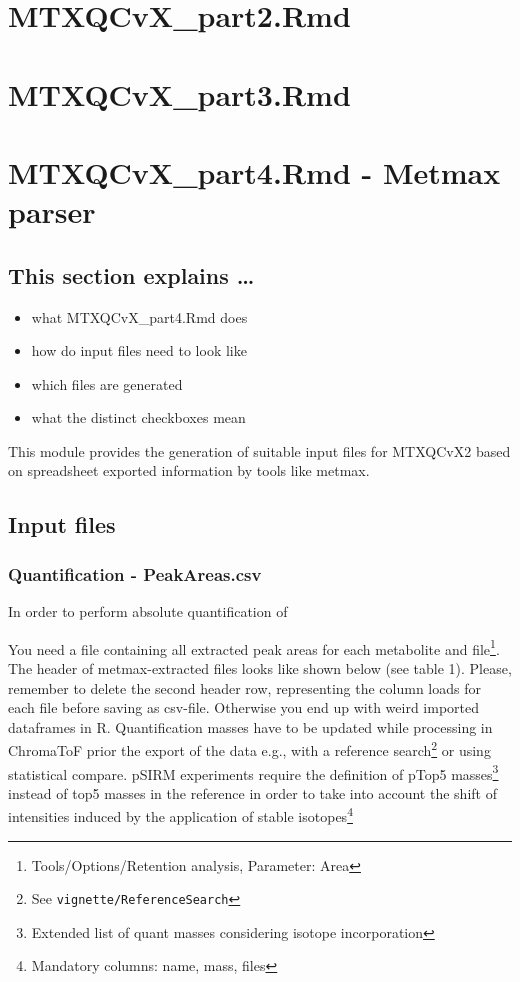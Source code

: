 \documentclass[]{book}
\providecommand{\tightlist}{%
  \setlength{\itemsep}{0pt}\setlength{\parskip}{0pt}}
\let\rmarkdownfootnote\footnote%
\def\footnote{\protect\rmarkdownfootnote}
\theoremstyle{definition}
\theoremstyle{definition}
\theoremstyle{definition}
\theoremstyle{remark}
\begin{document}
\chapter{MTXQCvX\_part2.Rmd}\label{part2}

\chapter{MTXQCvX\_part3.Rmd}\label{part3}

\chapter{MTXQCvX\_part4.Rmd - Metmax parser}\label{Metmax}

\section{This section explains \ldots{}}\label{this-section-explains}

\begin{itemize}
\tightlist
\item
  what MTXQCvX\_part4.Rmd does
\item
  how do input files need to look like
\item
  which files are generated
\item
  what the distinct checkboxes mean
\end{itemize}

This module provides the generation of suitable input files for MTXQCvX2
based on spreadsheet exported information by tools like metmax.

\section{Input files}\label{input-files-1}

\subsection{Quantification -
PeakAreas.csv}\label{quantification---peakareas.csv}

In order to perform absolute quantification of

You need a file containing all extracted peak areas for each metabolite
and file\footnote{Tools/Options/Retention analysis, Parameter: Area}.
The header of metmax-extracted files looks like shown below (see table
1). Please, remember to delete the second header row, representing the
column loads for each file before saving as csv-file. Otherwise you end
up with weird imported dataframes in R. Quantification masses have to be
updated while processing in ChromaToF prior the export of the data e.g.,
with a reference search\footnote{See \texttt{vignette/ReferenceSearch}}
or using statistical compare. pSIRM experiments require the definition
of pTop5 masses\footnote{Extended list of quant masses considering
  isotope incorporation} instead of top5 masses in the reference in
order to take into account the shift of intensities induced by the
application of stable isotopes\footnote{Mandatory columns: name, mass,
  files}
\end{document}
